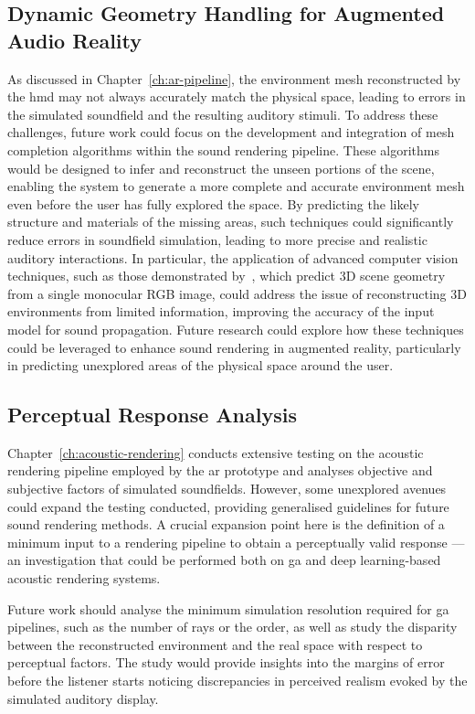 \subsection{Dynamic Geometry Handling for Augmented Audio Reality}
As discussed in Chapter~\ref{ch:ar-pipeline}, the environment mesh reconstructed by the \acrshort{hmd} may not always accurately match the physical space, leading to errors in the simulated soundfield and the resulting auditory stimuli. To address these challenges, future work could focus on the development and integration of mesh completion algorithms within the sound rendering pipeline. These algorithms would be designed to infer and reconstruct the unseen portions of the scene, enabling the system to generate a more complete and accurate environment mesh even before the user has fully explored the space. By predicting the likely structure and materials of the missing areas, such techniques could significantly reduce errors in soundfield simulation, leading to more precise and realistic auditory interactions.
In particular, the application of advanced computer vision techniques, such as those demonstrated by~\cite{cao2022monoscene}, which predict 3D scene geometry from a single monocular RGB image, could address the issue of reconstructing 3D environments from limited information, improving the accuracy of the input model for sound propagation. Future research could explore how these techniques could be leveraged to enhance sound rendering in augmented reality, particularly in predicting unexplored areas of the physical space around the user.

\subsection{Perceptual Response Analysis}
Chapter~\ref{ch:acoustic-rendering} conducts extensive testing on the acoustic rendering pipeline employed by the \acrshort{ar} prototype and analyses objective and subjective factors of simulated soundfields. However, some unexplored avenues could expand the testing conducted, providing generalised guidelines for future sound rendering methods. A crucial expansion point here is the definition of a minimum input to a rendering pipeline to obtain a perceptually valid response --- an investigation that could be performed both on \acrshort{ga} and deep learning-based acoustic rendering systems.\par
Future work should analyse the minimum simulation resolution required for \acrshort{ga} pipelines, such as the number of rays or the order, as well as study the disparity between the reconstructed environment and the real space with respect to perceptual factors. The study would provide insights into the margins of error before the listener starts noticing discrepancies in perceived realism evoked by the simulated auditory display.\par

